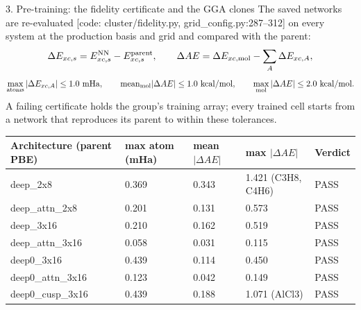 \begin{frame}[label=f16]{3. Pre-training: the fidelity certificate and the GGA clones}
  \small
  The saved networks are re-evaluated [code: cluster/fidelity.py, grid\_config.py:287--312] on every system at the production basis and grid and compared with the parent:
  \[
  \Delta E_{xc,s} = E_{xc,s}^{\rm NN} - E_{xc,s}^{\rm parent}, \qquad
  \Delta AE = \Delta E_{xc,{\rm mol}} - \sum_A \Delta E_{xc,A},
  \]
  \vspace{-0.9em}
  \[
  \max_{\rm atoms} |\Delta E_{xc,A}| \le 1.0\ \text{mHa}, \qquad
  \mathrm{mean}_{\rm mol} |\Delta AE| \le 1.0\ \text{kcal/mol}, \qquad
  \max_{\rm mol} |\Delta AE| \le 2.0\ \text{kcal/mol}.
  \]
  A failing certificate holds the group's training array; every trained cell starts from a network that reproduces its parent to within these tolerances.
  \begin{center}\small
  \begin{tabular}{lllll}
  \toprule
  Architecture (parent PBE) & max atom (mHa) & mean $|\Delta AE|$ & max $|\Delta AE|$ & Verdict \\ \midrule
  deep\_2x8 & 0.369 & 0.343 & 1.421 (C3H8, C4H6) & PASS \\
  deep\_attn\_2x8 & 0.201 & 0.131 & 0.573 & PASS \\
  deep\_3x16 & 0.210 & 0.162 & 0.519 & PASS \\
  deep\_attn\_3x16 & 0.058 & 0.031 & 0.115 & PASS \\
  deep0\_3x16 & 0.439 & 0.114 & 0.450 & PASS \\
  deep0\_attn\_3x16 & 0.123 & 0.042 & 0.149 & PASS \\
  deep0\_cusp\_3x16 & 0.439 & 0.188 & 1.071 (AlCl3) & PASS \\
  \bottomrule
  \end{tabular}
  \end{center}
  \hfill \hyperlink{b5}{}
\end{frame}
